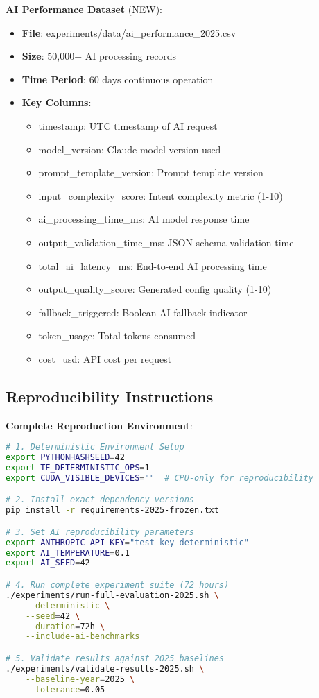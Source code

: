 \documentclass[conference]{IEEEtran}
\begin{document}
\textbf{AI Performance Dataset} (NEW):
\begin{itemize}
\item \textbf{File}: experiments/data/ai\_performance\_2025.csv
\item \textbf{Size}: 50,000+ AI processing records
\item \textbf{Time Period}: 60 days continuous operation
\item \textbf{Key Columns}:
  \begin{itemize}
  \item timestamp: UTC timestamp of AI request
  \item model\_version: Claude model version used
  \item prompt\_template\_version: Prompt template version
  \item input\_complexity\_score: Intent complexity metric (1-10)
  \item ai\_processing\_time\_ms: AI model response time
  \item output\_validation\_time\_ms: JSON schema validation time
  \item total\_ai\_latency\_ms: End-to-end AI processing time
  \item output\_quality\_score: Generated config quality (1-10)
  \item fallback\_triggered: Boolean AI fallback indicator
  \item token\_usage: Total tokens consumed
  \item cost\_usd: API cost per request
  \end{itemize}
\end{itemize}

\subsection{Reproducibility Instructions}

\textbf{Complete Reproduction Environment}:
\begin{lstlisting}[language=Bash]
# 1. Deterministic Environment Setup
export PYTHONHASHSEED=42
export TF_DETERMINISTIC_OPS=1
export CUDA_VISIBLE_DEVICES=""  # CPU-only for reproducibility

# 2. Install exact dependency versions
pip install -r requirements-2025-frozen.txt

# 3. Set AI reproducibility parameters
export ANTHROPIC_API_KEY="test-key-deterministic"
export AI_TEMPERATURE=0.1
export AI_SEED=42

# 4. Run complete experiment suite (72 hours)
./experiments/run-full-evaluation-2025.sh \
    --deterministic \
    --seed=42 \
    --duration=72h \
    --include-ai-benchmarks

# 5. Validate results against 2025 baselines
./experiments/validate-results-2025.sh \
    --baseline-year=2025 \
    --tolerance=0.05
\end{lstlisting}
\end{document}
